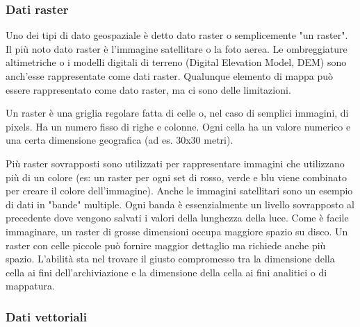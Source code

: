 \subsubsection{Dati raster}\label{label_rasterdata}

Uno dei tipi di dato geospaziale è detto dato raster o semplicemente "un
raster". Il più noto dato raster è l'immagine satellitare o la foto
aerea. Le ombreggiature altimetriche o i modelli digitali di terreno (Digital Elevation Model, DEM)
sono anch'esse rappresentate come dati raster. Qualunque elemento di mappa può essere
rappresentato come dato raster, ma ci sono delle limitazioni.

Un raster è una griglia regolare fatta di celle o, nel caso di semplici
immagini, di pixels. Ha un numero fisso di righe e colonne.
Ogni cella ha un valore numerico e una certa dimensione geografica
(ad es. 30x30 metri).

Più raster sovrapposti sono utilizzati per rappresentare immagini che utilizzano
più di un colore (es: un raster per ogni set di rosso, verde e blu viene combinato
per creare il colore dell’immagine). Anche le immagini satellitari sono un esempio
di dati in "bande" multiple. Ogni banda è essenzialmente un livello sovrapposto
al precedente dove vengono salvati i valori della lunghezza della luce. Come è
facile immaginare, un raster di grosse dimensioni occupa maggiore spazio su disco.
Un raster con celle piccole può fornire maggior dettaglio ma richiede anche più spazio.
L'abilità sta nel trovare il giusto compromesso tra la dimensione della cella
ai fini dell'archiviazione e la dimensione della cella ai fini analitici
o di mappatura.

\subsubsection{Dati vettoriali}\label{label_vectordata}
